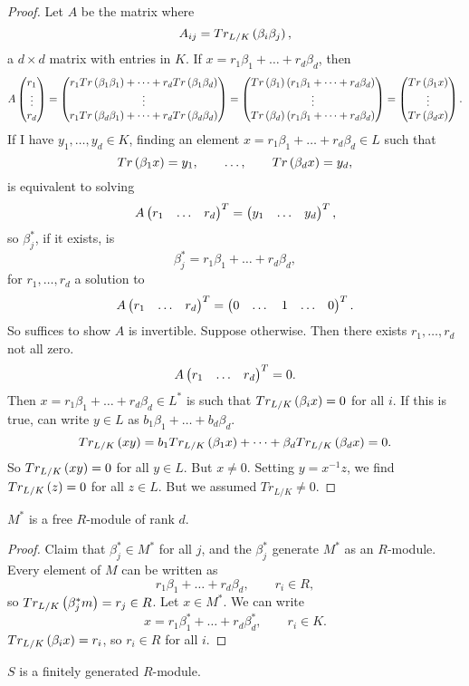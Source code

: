\begin{proof}
Let $ A $ be the matrix where
$$ A_{ij} = Tr_{L / K}\left( \beta_i\beta_j \right), $$
a $ d \times d $ matrix with entries in $ K $. If $ x = r_1\beta_1 + \dots + r_d\beta_d $, then
$$ A\begin{pmatrix} r_1 \\ \vdots \\ r_d \end{pmatrix} = \begin{pmatrix} r_1Tr\left( \beta_1\beta_1 \right) + \dots + r_dTr\left( \beta_1\beta_d \right) \\ \vdots \\ r_1Tr\left( \beta_d\beta_1 \right) + \dots + r_dTr\left( \beta_d\beta_d \right) \end{pmatrix} = \begin{pmatrix} Tr\left( \beta_1 \right)\left( r_1\beta_1 + \dots + r_d\beta_d \right) \\ \vdots \\ Tr\left( \beta_d \right)\left( r_1\beta_1 + \dots + r_d\beta_d \right) \end{pmatrix} = \begin{pmatrix} Tr\left( \beta_1x \right) \\ \vdots \\ Tr\left( \beta_dx \right) \end{pmatrix}. $$
If I have $ y_1, \dots, y_d \in K $, finding an element $ x = r_1\beta_1 + \dots + r_d\beta_d \in L $ such that
$$ Tr\left( \beta_1x \right) = y_1, \qquad \dots, \qquad Tr\left( \beta_dx \right) = y_d, $$
is equivalent to solving
$$ A\onebythree{r_1}{\dots}{r_d}^T = \onebythree{y_1}{\dots}{y_d}^T, $$
so $ \beta_j^* $, if it exists, is
$$ \beta_j^* = r_1\beta_1 + \dots + r_d\beta_d, $$
for $ r_1, \dots, r_d $ a solution to
$$ A\onebythree{r_1}{\dots}{r_d}^T = \onebythree{0}{\dots & 1 & \dots}{0}^T. $$
So suffices to show $ A $ is invertible. Suppose otherwise. Then there exists $ r_1, \dots, r_d $ not all zero.
$$ A\onebythree{r_1}{\dots}{r_d}^T = 0. $$
Then $ x = r_1\beta_1 + \dots + r_d\beta_d \in L^* $ is such that $ Tr_{L / K}\left( \beta_ix \right) = 0 $ for all $ i $. If this is true, can write $ y \in L $ as $ b_1\beta_1 + \dots + b_d\beta_d $.
$$ Tr_{L / K}\left( xy \right) = b_1Tr_{L / K}\left( \beta_1x \right) + \dots + \beta_dTr_{L / K}\left( \beta_dx \right) = 0. $$
So $ Tr_{L / K}\left( xy \right) = 0 $ for all $ y \in L $. But $ x \ne 0 $. Setting $ y = x^{-1}z $, we find $ Tr_{L / K}\left( z \right) = 0 $ for all $ z \in L $. But we assumed $ Tr_{L / K} \ne 0 $.
\end{proof}

\begin{corollary}
$ M^* $ is a free $ R $-module of rank $ d $.
\end{corollary}

\begin{proof}
Claim that $ \beta_j^* \in M^* $ for all $ j $, and the $ \beta_j^* $ generate $ M^* $ as an $ R $-module. Every element of $ M $ can be written as
$$ r_1\beta_1 + \dots + r_d\beta_d, \qquad r_i \in R, $$
so $ Tr_{L / K}\left( \beta_j^*m \right) = r_j \in R $. Let $ x \in M^* $. We can write
$$ x = r_1\beta_1^* + \dots + r_d\beta_d^*, \qquad r_i \in K. $$
$ Tr_{L / K}\left( \beta_ix \right) = r_i $, so $ r_i \in R $ for all $ i $.
\end{proof}

\begin{corollary}
$ S $ is a finitely generated $ R $-module.
\end{corollary}

